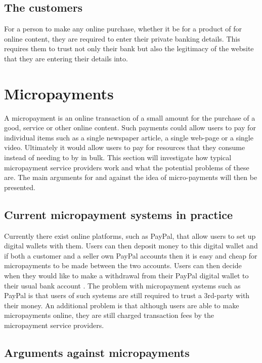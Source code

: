 \subsection{The customers}
For a person to make any online purchase, whether it be for a product of for online content, they are required to enter their private banking details. This requires them to trust not only their bank but also the legitimacy of the website that they are entering their details into.


\section{Micropayments}

A micropayment is an online transaction of a small amount for the purchase of a good, service or other online content. Such payments could allow users to pay for individual items such as a single newspaper article, a single web-page or a single video. Ultimately it would allow users to pay for resources that they consume instead of needing to by in bulk. This section will investigate how typical micropayment service providers work and what the potential problems of these are. The main arguments for and against the idea of micro-payments will then be presented.

    \subsection{Current micropayment systems in practice}
    
    Currently there exist online platforms, such as PayPal, that allow users to set up digital wallets with them. Users can then deposit money to this digital wallet and if both a customer and a seller own PayPal accounts then it is easy and cheap for micropayments to be made between the two accounts. Users can then decide when they would like to make a withdrawal from their PayPal digital wallet to their usual bank account \parencite{micropay}.
    The problem with micropayment systems such as PayPal is that users of such systems are still required to trust a 3rd-party with their money. An additional problem is that although users are able to make micropayments online, they are still charged transaction fees by the micropayment service providers. 
    
    \subsection{Arguments against micropayments}
    
